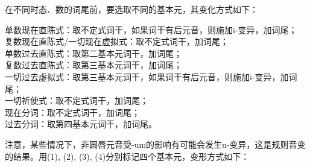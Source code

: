 在不同时态、数的词尾前，要选取不同的基本元，其变化方式如下：

\begin{info}
    单数现在直陈式：取不定式词干，如果词干有后元音，则施加i-变异，加词尾； \\
    复数现在直陈式/一切现在虚拟式：取不定式词干，加词尾；          \\
    单数过去直陈式：取第二基本元词干，加词尾；                \\
    复数过去直陈式：取第三基本元词干，加词尾；                \\
    一切过去虚拟式：取第三基本元词干，如果词干有后元音，则施加i-变异，加词尾；                                   \\
    一切祈使式：取不定式词干，加词尾；                    \\
    现在分词：取不定式词干，加词尾；                     \\
    过去分词：取第四基本元词干，加词尾。
\end{info}

注意，某些情况下，非圆唇元音受-um的影响有可能会发生u-变异，这是规则音变的结果。用(1), (2), (3), (4)分别标记四个基本元，变形方式如下：

